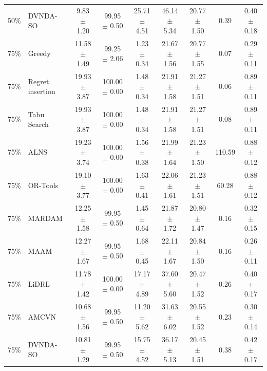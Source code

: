 \begin{tabular}{clccccccc}
50\% & DVNDA-SO & 9.83 $\pm$ 1.20 & 99.95 $\pm$ 0.50 & 25.71 $\pm$ 4.51 & 46.14 $\pm$ 5.34 & 20.77 $\pm$ 1.50 & 0.39 & 0.40 $\pm$ 0.18 \\
75\% & Greedy & 11.58 $\pm$ 1.49 & 99.25 $\pm$ 2.06 & 1.23 $\pm$ 0.34 & 21.67 $\pm$ 1.56 & 20.77 $\pm$ 1.55 & 0.07 & 0.29 $\pm$ 0.11 \\
75\% & Regret insertion & 19.93 $\pm$ 3.87 & 100.00 $\pm$ 0.00 & 1.48 $\pm$ 0.34 & 21.91 $\pm$ 1.58 & 21.27 $\pm$ 1.51 & 0.06 & 0.89 $\pm$ 0.11 \\
75\% & Tabu Search & 19.93 $\pm$ 3.87 & 100.00 $\pm$ 0.00 & 1.48 $\pm$ 0.34 & 21.91 $\pm$ 1.58 & 21.27 $\pm$ 1.51 & 0.08 & 0.89 $\pm$ 0.11 \\
75\% & ALNS & 19.23 $\pm$ 3.74 & 100.00 $\pm$ 0.00 & 1.56 $\pm$ 0.38 & 21.99 $\pm$ 1.64 & 21.23 $\pm$ 1.50 & 110.59 & 0.88 $\pm$ 0.12 \\
75\% & OR-Tools & 19.10 $\pm$ 3.77 & 100.00 $\pm$ 0.00 & 1.63 $\pm$ 0.41 & 22.06 $\pm$ 1.61 & 21.23 $\pm$ 1.51 & 60.28 & 0.88 $\pm$ 0.12 \\
75\% & MARDAM & 12.25 $\pm$ 1.58 & 99.95 $\pm$ 0.50 & 1.45 $\pm$ 0.64 & 21.87 $\pm$ 1.72 & 20.80 $\pm$ 1.47 & 0.16 & 0.32 $\pm$ 0.15 \\
75\% & MAAM & 12.27 $\pm$ 1.67 & 99.95 $\pm$ 0.50 & 1.68 $\pm$ 0.45 & 22.11 $\pm$ 1.67 & 20.84 $\pm$ 1.50 & 0.16 & 0.26 $\pm$ 0.11 \\
75\% & LiDRL & 11.78 $\pm$ 1.42 & 100.00 $\pm$ 0.00 & 17.17 $\pm$ 4.89 & 37.60 $\pm$ 5.60 & 20.47 $\pm$ 1.52 & 0.26 & 0.40 $\pm$ 0.17 \\
75\% & AMCVN & 10.68 $\pm$ 1.56 & 99.95 $\pm$ 0.50 & 11.20 $\pm$ 5.62 & 31.63 $\pm$ 6.02 & 20.55 $\pm$ 1.52 & 0.23 & 0.30 $\pm$ 0.14 \\
75\% & DVNDA-SO & 10.81 $\pm$ 1.29 & 99.95 $\pm$ 0.50 & 15.75 $\pm$ 4.52 & 36.17 $\pm$ 5.13 & 20.45 $\pm$ 1.51 & 0.38 & 0.42 $\pm$ 0.17 \\
\bottomrule
\end{tabular}
